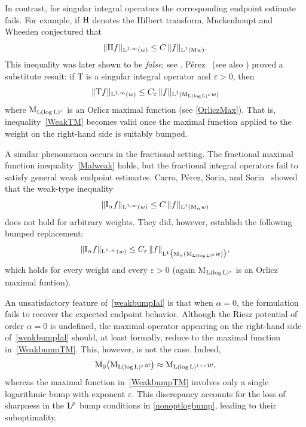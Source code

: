 \documentclass[11pt, a4paper, reqno]{amsart}
\newcommand{\ep}{\epsilon}
\newcommand{\Lup}{\textup{L}}
\theoremstyle{definition}
\theoremstyle{remark}
\begin{document}
In contrast, for singular integral operators the corresponding endpoint estimate fails. For example, if $\textup{H}$ denotes the Hilbert transform, Muckenhoupt and Wheeden conjectured that
\begin{equation}\label{WeakTM}
\|\textup{H}f\|_{\Lup^{1,\infty}(w)}
\le C\,\|f\|_{\Lup^1(\textup{M}w)}.
\end{equation}
This inequality was later shown to be \emph{false}; see \cite{Reg,RegTh,HM}. P\'erez~\cite{Per94Lon} (see also \cite{HP}) proved a substitute result: if T is a singular integral operator and $\varepsilon>0$, then
\begin{equation}\label{WeakbumpTM}
\|\textup{T}f\|_{\Lup^{1,\infty}(w)}
\leq {C_{\varepsilon}}\,\|f\|_{\Lup^1(\textup{M}_{\Lup(\log \Lup)^\varepsilon} w)}
\end{equation}
where $\textup{M}_{\Lup(\log \Lup)^{\varepsilon}}$ is an Orlicz maximal function (see \eqref{OrliczMax}). That is, inequality~\eqref{WeakTM} becomes valid once the maximal function applied to the weight on the right-hand side is suitably bumped.

A similar phenomenon occurs in the fractional setting. The fractional maximal function inequality~\eqref{Malweak} holds, but the fractional integral operators fail to satisfy general weak endpoint estimates. Carro, P\'erez, Soria, and Soria~\cite{CPSS} showed that the weak-type inequality
\begin{equation}\label{falseendptIal}
\|\textup{I}_\alpha f\|_{\Lup^{1,\infty}(w)}
\le C\,\|f\|_{\Lup^1(\textup{M}_\alpha w)}
\end{equation}
does not hold for arbitrary weights. They did, however, establish the following bumped replacement:
\begin{equation}\label{weakbumpIal}
\|\textup{I}_\alpha f\|_{\Lup^{1,\infty}(w)}
\le {C_{\varepsilon}}\,\|f\|_{\Lup^1\bigl(\textup{M}_\alpha(\textup{M}_{\Lup(\log \Lup)^{\varepsilon}} w)\bigr)},
\end{equation}
which holds for every weight and every $\varepsilon>0$ (again M$_{\Lup(\log \Lup)^\ep}$ is an Orlicz maximal funtion).

An unsatisfactory feature of~\eqref{weakbumpIal} is that when $\alpha=0$, the formulation fails to recover the expected endpoint behavior. Although the Riesz potential of order $\alpha=0$ is undefined, the maximal operator appearing on the right-hand side of~\eqref{weakbumpIal} should, at least formally, reduce to the maximal function in~\eqref{WeakbumpTM}. This, however, is not the case. Indeed,
\[
\textup{M}_0\bigl(\textup{M}_{\Lup(\log \Lup)^{\varepsilon}} w\bigr)
\approx \textup{M}_{\Lup(\log \Lup)^{1+\varepsilon}} w,
\]
whereas the maximal function in~\eqref{WeakbumpTM} involves only a single logarithmic bump with exponent $\varepsilon$.  {This discrepancy accounts for the loss of sharpness in the $\Lup^p$ bump conditions in \eqref{nonoptlogbump}, leading to their suboptimality.}
\end{document}
